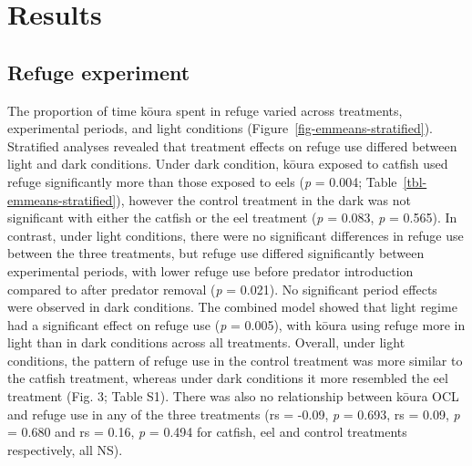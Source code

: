 \documentclass[
  12pt,
  a4paper,
]{scrbook}
\begin{document}

\chapter{Results}\label{results}

\section{Refuge experiment}\label{refuge-experiment-1}

The proportion of time kōura spent in refuge varied across treatments,
experimental periods, and light conditions
(Figure~\ref{fig-emmeans-stratified}). Stratified analyses revealed that
treatment effects on refuge use differed between light and dark
conditions. Under dark condition, kōura exposed to catfish used refuge
significantly more than those exposed to eels (\emph{p} = 0.004;
Table~\ref{tbl-emmeans-stratified}), however the control treatment in
the dark was not significant with either the catfish or the eel
treatment (\emph{p} = 0.083, \emph{p} = 0.565). In contrast, under light
conditions, there were no significant differences in refuge use between
the three treatments, but refuge use differed significantly between
experimental periods, with lower refuge use before predator introduction
compared to after predator removal (\emph{p} = 0.021). No significant
period effects were observed in dark conditions. The combined model
showed that light regime had a significant effect on refuge use
(\emph{p} = 0.005), with kōura using refuge more in light than in dark
conditions across all treatments. Overall, under light conditions, the
pattern of refuge use in the control treatment was more similar to the
catfish treatment, whereas under dark conditions it more resembled the
eel treatment (Fig. 3; Table S1). There was also no relationship between
kōura OCL and refuge use in any of the three treatments (rs = -0.09,
\emph{p} = 0.693, rs = 0.09, \emph{p} = 0.680 and rs = 0.16, \emph{p} =
0.494 for catfish, eel and control treatments respectively, all NS).
\end{document}
